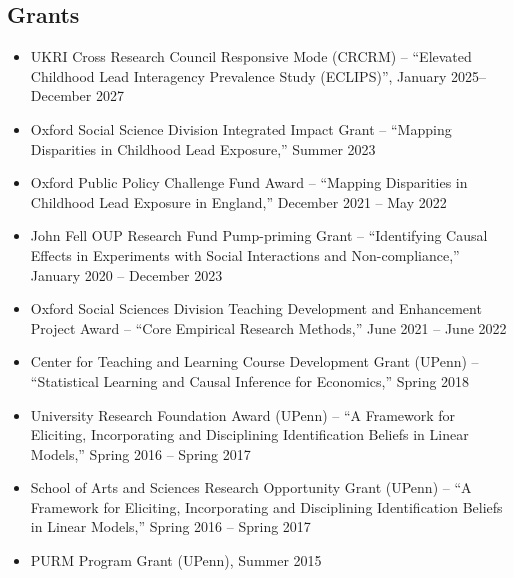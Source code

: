 \documentclass[line,overlapped]{myres}
\begin{document}
\begin{resume}
\section{\sc Grants}
\begin{itemize}
  \item UKRI Cross Research Council Responsive Mode (CRCRM) -- ``Elevated Childhood Lead Interagency Prevalence Study (ECLIPS)'', January 2025--December 2027 %
  \item Oxford Social Science Division Integrated Impact Grant -- ``Mapping Disparities in Childhood Lead Exposure,'' Summer 2023 %
  \item Oxford Public Policy Challenge Fund Award -- ``Mapping Disparities in Childhood Lead Exposure in England,'' December 2021 -- May 2022 %
  \item John Fell OUP Research Fund Pump-priming Grant -- ``Identifying Causal Effects in Experiments with Social Interactions and Non-compliance,'' January 2020 -- December 2023 %
  \item Oxford Social Sciences Division Teaching Development and Enhancement Project Award -- ``Core Empirical Research Methods,'' June 2021 -- June 2022 %
  \item Center for Teaching and Learning Course Development Grant (UPenn) -- ``Statistical Learning and Causal Inference for Economics,'' Spring 2018 %
  \item University Research Foundation Award (UPenn) -- ``A Framework for Eliciting, Incorporating and Disciplining Identification Beliefs in Linear Models,'' Spring 2016 -- Spring 2017 %
  \item School of Arts and Sciences Research Opportunity Grant (UPenn) -- ``A Framework for Eliciting, Incorporating and Disciplining Identification Beliefs in Linear Models,'' Spring 2016 -- Spring 2017  %
  \item PURM Program Grant (UPenn), Summer 2015 %
\end{itemize}





\end{resume}
\end{document}
